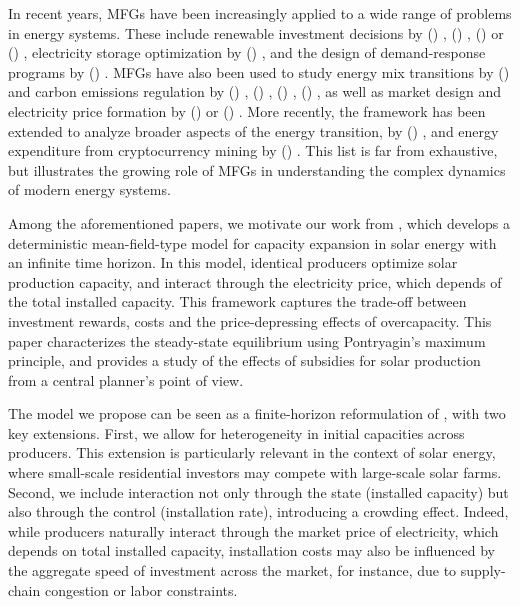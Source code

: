 \documentclass[12pt]{article}
\newcommand\citeayn[2][]{\citeauthor*{#2} (\citeyear{#2}) \cite[#1]{#2}}
\begin{document}
In recent years, MFGs have been increasingly applied to a wide range of problems in energy systems. These include renewable investment decisions by \citeayn{aid2020entry}, \citeayn{alasseur2023mean}, \citeayn{escribe2024mean} or \citeayn{aid2025regulation}, electricity storage optimization by \citeayn{alasseur2020extended}, and the design of demand-response programs by \citeayn{elie2021meanfield}. MFGs have also been used to study energy mix transitions by \citeayn{chan2017fracking} and carbon emissions regulation by \citeayn{carmona2022mean}, \citeayn{hernandezsantibanez2023pollution}, \citeayn{bichuch2024stackelberg}, \citeayn{dayanikli2024multipopulation}, as well as market design and electricity price formation by \citeayn{firoozi2022principal} or \citeayn{bassiere2024meanfield}. More recently, the framework has been extended to analyze broader aspects of the energy transition, by \citeayn{dumitrescu2024energy}, and energy expenditure from cryptocurrency mining by \citeayn{li2024mean}. This list is far from exhaustive, but illustrates the growing role of MFGs in understanding the complex dynamics of modern energy systems. 

Among the aforementioned papers, we motivate our work from \cite{alasseur2023mean}, which develops a deterministic mean-field-type model for capacity expansion in solar energy with an infinite time horizon. In this model, identical producers optimize solar production capacity, and interact through the electricity price, which depends of the total installed capacity. This framework captures the trade-off between investment rewards, costs and the price-depressing effects of overcapacity. This paper characterizes the steady-state equilibrium using Pontryagin’s maximum principle, and provides a study of the effects of subsidies for solar production from a central planner's point of view.


The model we propose can be seen as a finite-horizon reformulation of \cite{alasseur2023mean}, with two key extensions. First, we allow for heterogeneity in initial capacities across producers. This extension is particularly relevant in the context of solar energy, where small-scale residential investors may compete with large-scale solar farms. Second, we include interaction not only through the state (installed capacity) but also through the control (installation rate), introducing a crowding effect. Indeed, while producers naturally interact through the market price of electricity, which depends on total installed capacity, installation costs may also be influenced by the aggregate speed of investment across the market, for instance, due to supply-chain congestion or labor constraints. 
\end{document}
